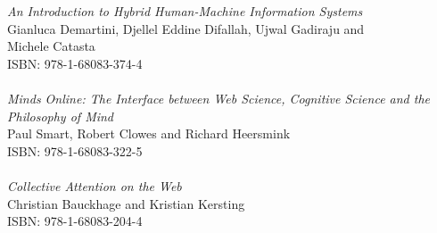 \vspace{12pt}
\noindent \textit{An Introduction to Hybrid Human-Machine Information Systems}\\
Gianluca Demartini, Djellel Eddine Difallah, Ujwal Gadiraju and\\ Michele Catasta\\
ISBN: 978-1-68083-374-4\\
\\
\noindent \textit{Minds Online: The Interface between Web Science, Cognitive Science and the Philosophy of Mind}\\
Paul Smart, Robert Clowes and Richard Heersmink\\
ISBN: 978-1-68083-322-5\\
\\
\noindent \textit{Collective Attention on the Web}\\
Christian Bauckhage and Kristian Kersting\\
ISBN: 978-1-68083-204-4